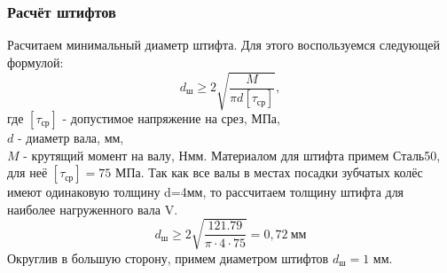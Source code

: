 \documentclass[14pt,a4paper,russian]{scrartcl}
\begin{document}
    \subsubsection{Расчёт штифтов}
        Расчитаем минимальный диаметр штифта. Для этого воспользуемся следующей формулой:
        \[ d_\text{ш} \geq 2\sqrt{\frac{M}{\pi d [\tau_{\text{ср}}]}}, \]
        где \( [\tau_{\text{ср}}] \) - допустимое напряжение на срез, МПа,\\
        \( d \) - диаметр вала, мм,\\
        \( M \) - крутящий момент на валу, Нмм.
        Материалом для штифта примем Сталь50, для неё \( [\tau_{\text{ср}}] =75\) МПа.
        Так как все валы в местах посадки зубчатых колёс имеют одинаковую толщину d=4мм, то рассчитаем
        толщину штифта для наиболее нагруженного вала V.
        \[ d_\text{ш} \geq 2\sqrt{\frac{121.79}{\pi\cdot 4\cdot 75}} = 0,72\ \text{мм} \]
        Округлив в большую сторону, примем диаметром штифтов \( d_\text{ш} = 1 \) мм.
        
\end{document}
